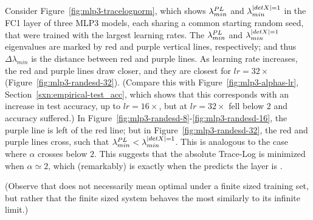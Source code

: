 Consider Figure~\ref{fig:mlp3-tracelognorm}, which shows $\lambda^{PL}_{min}$ and $\lambda^{\vert detX\vert=1}_{min}$ in the FC1 layer of three MLP3 models, each sharing a common starting random seed, that were trained with the largest learning rates.
The $\lambda^{PL}_{min}$ and $\lambda^{\vert detX\vert=1}_{min}$ eigenvalues are marked by red and purple vertical lines, respectively; and thus $\Delta \lambda_{min}$ is the distance between red and purple lines.
%
As learning rate increases, the red and purple lines draw closer, and they are closest for $lr=32\times$ (Figure~\ref{fig:mlp3-randesd-32}). 
(Compare this with Figure~\ref{fig:mlp3-alphas-lr}, Section~\ref{sxn:empirical-test_acc}, which shows that this corresponds with an increase in test accuracy, up to $lr=16\times$, but at $lr=32\times$ \ALPHA fell below $2$ and accuracy suffered.) 
In Figure~\ref{fig:mlp3-randesd-8}-\ref{fig:mlp3-randesd-16}, the purple line is left of the red line; but in Figure~\ref{fig:mlp3-randesd-32}, the red and purple lines cross, such that $\lambda^{PL}_{min} < \lambda^{\vert detX\vert=1}_{min}$.
This is analogous to the case where $\alpha$ crosses below $2$. 
This suggests that the absolute Trace-Log is minimized when $\alpha\simeq2$, which (remarkably) is exactly when the \HTSR \Phenomenology predicts the layer is \Ideal.

(Observe that \Ideal does not necessarily mean optimal under a finite sized training set, but rather that the finite sized system behaves the most similarly to its infinite limit.)


